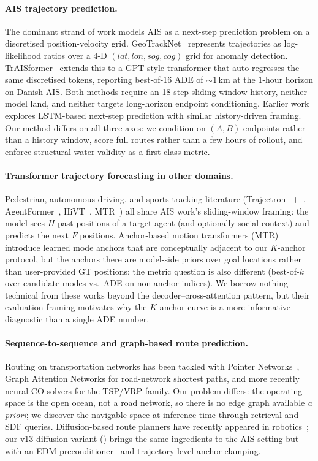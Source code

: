 \documentclass[11pt]{article}
\begin{document}
\paragraph{AIS trajectory prediction.}
The dominant strand of work models AIS as a next-step prediction
problem on a discretised position-velocity grid.
GeoTrackNet~\citep{geotracknet2018} represents trajectories as
log-likelihood ratios over a $4$-D $(lat, lon, sog, cog)$ grid for
anomaly detection.  TrAISformer~\citep{traisformer2024} extends this to
a GPT-style transformer that auto-regresses the same discretised tokens,
reporting best-of-16 ADE of $\sim 1$\,km at the $1$-hour horizon on
Danish AIS.  Both methods require an 18-step sliding-window history,
neither model land, and neither targets long-horizon endpoint
conditioning.  Earlier work~\citep{capobianco2021, forti2020}
explores LSTM-based next-step prediction with similar history-driven
framing.  Our method differs on all three axes: we condition on
$(A, B)$ endpoints rather than a history window, score full routes
rather than a few hours of rollout, and enforce structural
water-validity as a first-class metric.

\paragraph{Transformer trajectory forecasting in other domains.}
Pedestrian, autonomous-driving, and sports-tracking literature
(Trajectron++~\citep{trajectronpp2020}, AgentFormer~\citep{agentformer2021},
HiVT~\citep{hivt2022}, MTR~\citep{mtr2022}) all share AIS work's
sliding-window framing: the model sees $H$ past positions of a target
agent (and optionally social context) and predicts the next $F$
positions. Anchor-based motion transformers
(MTR) introduce learned mode anchors that are conceptually adjacent to
our $K$-anchor protocol, but the anchors there are model-side priors
over goal locations rather than user-provided GT positions; the metric
question is also different (best-of-$k$ over candidate modes vs.\ ADE
on non-anchor indices). We borrow nothing technical from these works
beyond the decoder--cross-attention pattern, but their evaluation
framing motivates why the $K$-anchor curve is a more informative
diagnostic than a single ADE number.

\paragraph{Sequence-to-sequence and graph-based route prediction.}
Routing on transportation networks has been tackled with Pointer
Networks~\citep{pointernet2015}, Graph Attention Networks for
road-network shortest paths, and more recently neural CO solvers for
the TSP/VRP family. Our problem differs: the operating space is the
open ocean, not a road network, so there is no edge graph available
\emph{a priori}; we discover the navigable space at inference time
through retrieval and SDF queries. Diffusion-based route planners have
recently appeared in robotics~\citep{motiondiffuser2023}; our v13
diffusion variant () brings the same
ingredients to the AIS setting but with an EDM
preconditioner~\citep{edm2022} and trajectory-level anchor clamping.
\end{document}
